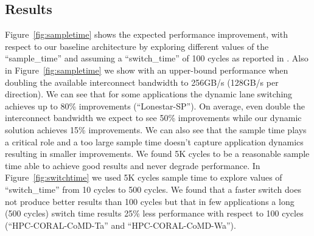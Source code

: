 \subsection{Results}
Figure~\ref{fig:sampletime} shows the expected performance improvement, with 
respect to our baseline architecture by exploring different values 
of the ``sample\_time'' and assuming a ``switch\_time'' of 100 cycles 
as reported in \cite{REALLY_NEED_REF_HERE}. Also in Figure~\ref{fig:sampletime}
we show with an upper-bound performance when doubling
the available interconnect bandwidth to 256GB/s (128GB/s per direction). 
We can see that for some applications the dynamic lane switching achieves up to
80\% improvements (``Lonestar-SP''). On average, even double the interconnect 
bandwidth we expect to see 50\% improvements while our dynamic solution 
achieves 15\% improvements. We can also see that the sample time plays a 
critical role and a too large sample time doesn't capture application dynamics 
resulting in smaller improvements. We found 5K cycles to be a reasonable sample
time able to achieve good results and never degrade performance. 
In Figure~\ref{fig:switchtime} we used 5K cycles sample time to
explore values of ``switch\_time'' from 10 cycles to 500 cycles.
We found that a faster switch does not produce better results than 100 cycles
but that in few applications a long (500 cycles) switch time results 25\% 
less performance with respect to 100 cycles (``HPC-CORAL-CoMD-Ta'' and 
``HPC-CORAL-CoMD-Wa'').






